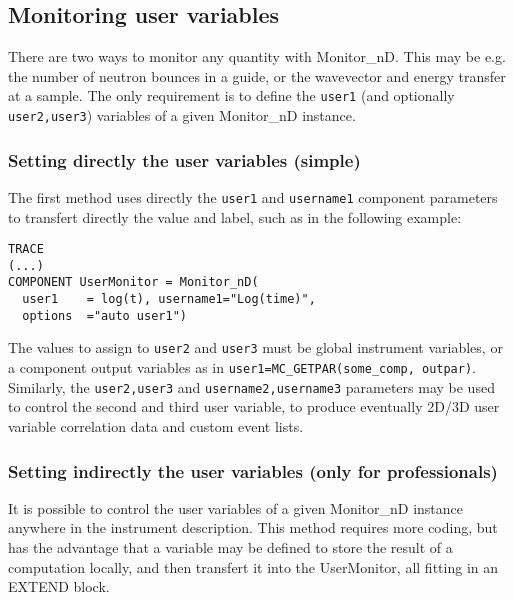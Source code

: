 \subsection{Monitoring user variables}
\label{s:monnd:user}

There are two ways to monitor any quantity with Monitor\_nD. This may be e.g. the number of neutron bounces in a guide, or the wavevector and energy transfer at a sample. The only requirement is to define the \verb+user1+ (and optionally \verb+user2,user3+) variables of a given Monitor\_nD instance.

\subsubsection{Setting directly the user variables (simple)}

The first method uses directly the \verb+user1+ and \verb+username1+ component parameters to transfert directly the value and label, such as in the following example:
\begin{verbatim}
TRACE
(...)
COMPONENT UserMonitor = Monitor_nD(
  user1    = log(t), username1="Log(time)",
  options  ="auto user1")
\end{verbatim}
The values to assign to \verb+user2+ and \verb+user3+ must be global instrument variables, or a component output variables as in \verb+user1=MC_GETPAR(some_comp, outpar)+.
Similarly, the \verb+user2,user3+ and \verb+username2,username3+ parameters may be used to control the second and third user variable, to produce eventually 2D/3D user variable correlation data and custom event lists.

\subsubsection{Setting indirectly the user variables (only for professionals)}

It is possible to control the user variables of a given Monitor\_nD instance anywhere in the instrument description. This method requires more coding, but has the advantage that a variable may be defined to store the result of a computation locally, and then transfert it into the UserMonitor, all fitting in an EXTEND block.

